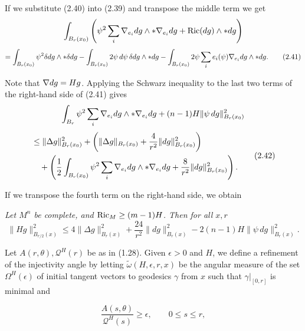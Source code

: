 If we substitute (2.40) into (2.39) and transpose the middle term we get
\[
\int_{B_r(x_0)} \left( \psi^2 \sum_i \nabla_{e_i}dg \wedge *\nabla_{e_i}dg + \operatorname{Ric}(dg)\wedge *dg \right)
\]
\begin{equation}
= \int_{B_r(x_0)} \psi^2 \delta dg \wedge *\delta dg
- \int_{B_r(x_0)} 2\psi\, d\psi\,\delta dg \wedge *dg
- \int_{B_r(x_0)} 2\psi \sum_i e_i(\psi)\nabla_{e_i}dg \wedge *dg.
\tag{2.41}
\end{equation}

Note that $\nabla dg = Hg$. Applying the Schwarz inequality to the last two terms of the right-hand side of (2.41) gives
\[
\int_{B_r} \psi^2 \sum_i \nabla_{e_i}dg \wedge *\nabla_{e_i}dg + (n-1)H \|\psi\,dg\|^2_{B_r(x_0)}
\]
\begin{equation}
\begin{aligned}
&\le \|\Delta g\|^2_{B_r(x_0)}
+ \left(\|\Delta g\|_{B_r(x_0)} + \frac{4}{r^2}\|dg\|^2_{B_r(x_0)}\right) \\
&\quad + \left(\frac12\int_{B_r(x_0)} \psi^2 \sum_i \nabla_{e_i}dg \wedge *\nabla_{e_i}dg
+ \frac{8}{r^2}\|dg\|^2_{B_r(x_0)}\right).
\end{aligned}
\tag{2.42}
\end{equation}

If we transpose the fourth term on the right-hand side, we obtain

\begin{proposition}
\label{prop:coercive-hessian-estimate}

\textit{Let $M^n$ be complete, and $\operatorname{Ric}_M \geq (m-1)H$. Then for all $x, r$}
\begin{equation}\tag{2.43}
\|Hg\|^2_{B_{r/2}(x)} \le 4\|\Delta g\|^2_{B_r(x)} + \frac{24}{r^2}\|dg\|^2_{B_r(x)}
- 2(n-1)H\|\psi\,dg\|^2_{B_r(x)}.
\end{equation}
\end{proposition}

Let $A(r,\theta), \mathcal{Q}^H(r)$ be as in (1.28). Given $\epsilon > 0$ and $H$, we define a refinement of the injectivity angle by letting $\widetilde{\omega}(H,\epsilon,r,x)$ be the angular
measure of the set $\Omega^H(\epsilon)$ of initial tangent vectors to geodesics $\gamma$ from $x$ such
that $\gamma|_{[0,r]}$ is minimal and

\begin{equation}\tag{2.44}
\frac{A(s,\theta)}{\mathcal{Q}^H(s)} \ge \epsilon,\qquad 0 \le s \le r,
\end{equation}

